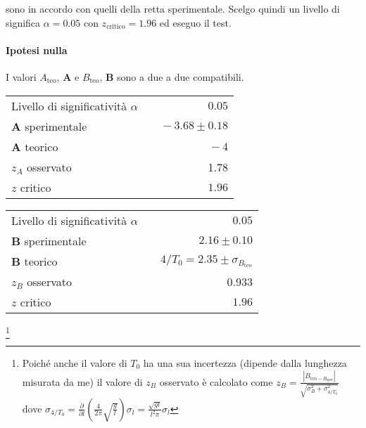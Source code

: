 \documentclass{article}
\begin{document}
	sono in accordo con quelli della retta sperimentale. Scelgo quindi un livello di significa $\alpha = 0.05$ con $z_{\text{critico}} = 1.96$ ed eseguo il test.
	
	\paragraph{Ipotesi nulla} I valori $A_{\text{teo}}$, $\mathbf{A}$ e  $B_{\text{teo}}$, $\mathbf{B}$ sono a due a due compatibili.
	
	
	
	\vspace{0.7cm}
	\begin{minipage}{0.5\textwidth}
		\begin{table}[H]
			\centering
			\begin{tabular}{lr} 
				Livello di significatività $\alpha$		&$\quad 0.05$  \\
				\textbf{A} sperimentale             	& $\quad-3.68 \pm 0.18 $     \\
				\textbf{A} teorico					&  $\quad-4$\\
				$z_{A}$ osservato					& 1.78 \\ 
				$z$ critico     	& $\quad 1.96$
			\end{tabular}
		\end{table}
	\end{minipage}
	\begin{minipage}{0.5\textwidth}
		\begin{table}[H]
			\centering
			\begin{tabular}{lr} 
				Livello di significatività $\alpha$		&$\quad 0.05$  \\
				\textbf{B} sperimentale				& $\quad2.16 \pm  0.10$\\
				\textbf{B} teorico					& $\quad4/T_0 = 2.35 \pm \sigma_{B_{\text{teo}}}$ \footnotemark \\
				$z_{B}$ osservato 					& $\quad$ $0.933 $ \\
				$z$ critico    	& $\quad 1.96$
			\end{tabular}
		\end{table}
	\end{minipage}
	\footnote{Poiché anche il valore di $T_0$ ha una sua incertezza (dipende dalla lunghezza misurata da me) il valore di $z_B$ osservato è calcolato come $z_B = \frac{|B_{\text{teo} - B_{\text{sper}}}|}{\sqrt{\sigma_B^2 + \sigma_{4/T_0}^2}}$ dove $\sigma_{4/T_0} = \frac{\partial}{\partial l}\left(\frac{4}{2\pi}\sqrt{\frac{g}{l}}\right)\sigma_l = \frac{\sqrt{gl}}{l^2\pi}\sigma_l$}
	\vspace{0.7cm}
	
\end{document}
